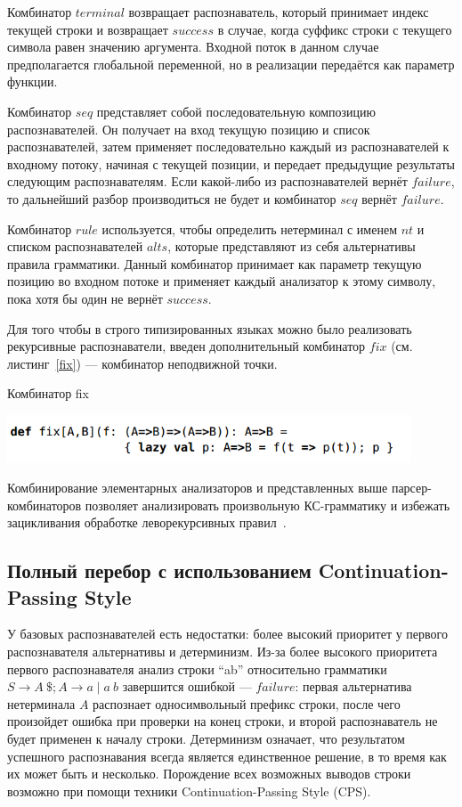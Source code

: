 Комбинатор $terminal$ возвращает распознаватель, который принимает индекс текущей строки и возвращает $success$ в случае, когда суффикс строки с текущего символа равен значению аргумента. Входной поток в данном случае предполагается глобальной переменной, но в реализации передаётся как параметр функции. 

Комбинатор $seq$ представляет собой последовательную композицию распознавателей. Он получает на вход текущую позицию и список распознавателей, затем применяет последовательно каждый из распознавателей к входному потоку, начиная с текущей позиции, и передает предыдущие результаты следующим распознавателям. Если какой-либо из распознавателей вернёт $failure$, то дальнейший разбор производиться не будет и комбинатор $seq$ вернёт $failure$. 

 Комбинатор $rule$ используется, чтобы определить нетерминал с именем $nt$ и списком распознавателей $alts$, которые представляют из себя альтернативы правила грамматики. Данный комбинатор принимает как параметр текущую позицию во входном потоке и применяет каждый анализатор к этому символу, пока хотя бы один не вернёт $success$. 

Для того чтобы в строго типизированных языках можно было реализовать рекурсивные распознаватели, введен дополнительный комбинатор $fix$ (см. листинг~\ref{fix}) --- комбинатор неподвижной точки.

\begin{listing}
\caption{Комбинатор fix}
\label{fix}
\centering
\includegraphics[width=0.9\textwidth]{Smolina/pics/fix.png}
\end{listing} 

Комбинирование элементарных анализаторов и представленных выше парсер-комбинаторов позволяет анализировать произвольную КС-грамматику и избежать зацикливания обработке леворекурсивных правил~\cite{GLL}.

\subsection{Полный перебор с использованием Continuation-Passing Style}
У базовых распознавателей есть недостатки: более высокий приоритет у первого распознавателя альтернативы и детерминизм. Из-за более высокого приоритета первого распознавателя анализ строки ``ab'' относительно грамматики $S \rightarrow A \ \$; A \rightarrow a \mid a \ b$ завершится ошибкой --- $failure$: первая альтернатива нетерминала $A$ распознает односимвольный префикс строки, после чего произойдет ошибка при проверки на конец строки, и второй распознаватель не будет применен к началу строки. Детерминизм означает, что результатом успешного распознавания всегда является единственное решение, в то время как их может быть и несколько. Порождение всех возможных выводов строки возможно при помощи техники Continuation-Passing Style (CPS).

